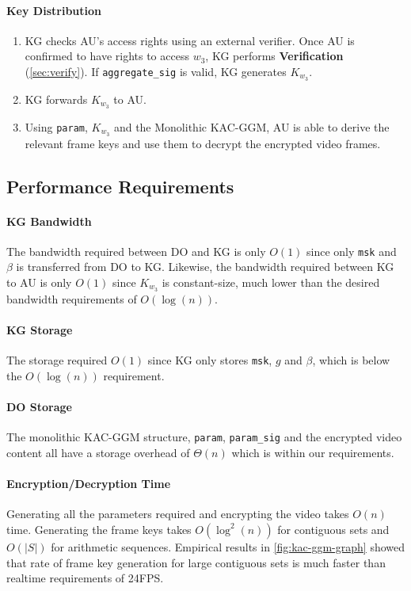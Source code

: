 \documentclass[hyp,a4paper,12pt,openbib]{socreport}
\begin{document}
\paragraph{Key Distribution}
\begin{enumerate}
\item KG checks AU's access rights using an external verifier. Once AU is confirmed to have rights to access $w_3$, KG performs \textbf{Verification} (\cref{sec:verify}). If \texttt{aggregate\_sig} is valid, KG generates $K_{w_3}$.
\item  KG forwards $K_{w_3}$ to AU.
\item Using \texttt{param}, $K_{w_{3}}$ and the Monolithic KAC-GGM, AU is able to derive the relevant frame keys and use them to decrypt the encrypted video frames.
\end{enumerate}




\subsection{Performance Requirements}

\paragraph{KG Bandwidth} The bandwidth required between DO and KG is only $O(1)$ since only \texttt{msk} and $\beta$ is transferred from DO to KG. Likewise, the bandwidth required between KG to AU is only $O(1)$ since $K_{w_3}$ is constant-size, much lower than the desired bandwidth requirements of $O(\log(n))$.
\paragraph{KG Storage} The storage required $O(1)$ since KG only stores \texttt{msk}, $g$ and $\beta$, which is below the $O(\log(n))$ requirement.
\paragraph{DO Storage} The monolithic KAC-GGM structure, \texttt{param}, \texttt{param\_sig} and the encrypted video content all have a storage overhead of $\Theta(n)$ which is within our requirements.  
\paragraph{Encryption/Decryption Time} Generating all the parameters required and encrypting the video takes $O(n)$ time. Generating the frame keys takes $O(\log^2(n))$ for contiguous sets and $O(|S|)$ for arithmetic sequences. Empirical results in \cref{fig:kac-ggm-graph} showed that rate of frame key generation for large contiguous sets is much faster than realtime requirements of 24FPS.
\end{document}
